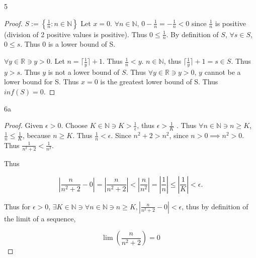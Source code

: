 \documentclass{article}
\newcommand{\R}{\mathbb{R}}
\newcommand{\N}{\mathbb{N}}
\newcommand{\abs}[1]{\left\lvert #1\right\rvert}
\newcommand{\ceil}[1]{\lceil{#1}\rceil}
\begin{document}
\begin{PROB}{5}\label{Problem 5.}
\end{PROB}
\begin{proof}
    $S := \left\{ \frac{1}{n} : n \in \N \right\}$ 
    Let $x = 0$. $\forall n \in \N$, $0 - \frac{1}{n} = -\frac{1}{n} < 0$ since $\frac{1}{n}$ is positive (division of 2 positive values is positive). Thus $0 \leq \frac{1}{n}$. By definition of $S$, $\forall s \in S$, $0 \leq s$. Thus $0$ is a lower bound of S. 
    
    
    $\forall y \in \R \ni y > 0$. Let $n = \ceil{\frac{1}{y}} + 1$. Thus $\frac{1}{n} < y$. $n \in \N$, thus $\ceil{\frac{1}{y}} + 1 = s \in S$. Thus $y > s$. Thus $y$ is not a lower bound of $S$. Thus $\forall y \in \R \ni y > 0$, $y$ cannot be a lower bound for S. Thus $x = 0$ is the greatest lower bound of S. Thus $inf(S) = 0$.            
\end{proof}


\bigskip

\begin{PROB}{6a}\label{Problem 6a.}
\end{PROB}
\begin{proof}
    Given $\epsilon > 0$. Choose $K \in \N \ni K > \frac{1}{\epsilon}$, thus $\epsilon > \frac{1}{K}$ . Thus $\forall n \in \N \ni n \geq K$, $\frac{1}{n} \leq \frac{1}{K}$, because $n \geq K$. Thus $\frac{1}{n} < \epsilon$. Since $n^2 + 2 > n^2$, since $n > 0 \implies n^2 > 0$. Thus $\frac{1}{n^2 + 2} < \frac{1}{n^2}$.    
    
    
    Thus 
    
    \[
        \abs{\frac{n}{n^2 + 2} - 0} = \abs{\frac{n}{n^2 + 2}} < \abs{\frac{n}{n^2}} = \abs{\frac{1}{n}} \leq \abs{\frac{1}{K}} < \epsilon.
    \]

    Thus for $\epsilon > 0$, $\exists K \in \N \ni \forall n \in \N \ni n \geq K, \abs{\frac{n}{n^2 + 2} - 0} < \epsilon$, thus by definition of the limit of a sequence,
    
    \[
        \lim \left(\frac{n}{n^2 + 2}\right) = 0
    \]
\end{proof}
\end{document}
